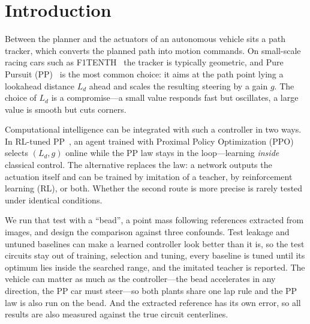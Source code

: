 \documentclass{IJCAS}
\begin{document}


\section{Introduction}
Between the planner and the actuators of an autonomous vehicle sits a path tracker, which converts the planned path into motion commands. On small-scale racing cars such as F1TENTH~\cite{okelly2020} the tracker is typically geometric, and Pure Pursuit (PP)~\cite{coulter1992,snider2009} is the most common choice: it aims at the path point lying a lookahead distance $L_d$ ahead and scales the resulting steering by a gain $g$. The choice of $L_d$ is a compromise---a small value responds fast but oscillates, a large value is smooth but cuts corners.

Computational intelligence can be integrated with such a controller in two ways. In RL-tuned PP~\cite{elgouhary2026}, an agent trained with Proximal Policy Optimization (PPO)~\cite{schulman2017} selects $(L_d,g)$ online while the PP law stays in the loop---learning \emph{inside} classical control. The alternative replaces the law: a network outputs the actuation itself and can be trained by imitation of a teacher, by reinforcement learning (RL), or both. Whether the second route is more precise is rarely tested under identical conditions.

We run that test with a ``bead'', a point mass following references extracted from images, and design the comparison against three confounds. Test leakage and untuned baselines can make a learned controller look better than it is, so the test circuits stay out of training, selection and tuning, every baseline is tuned until its optimum lies inside the searched range, and the imitated teacher is reported. The vehicle can matter as much as the controller---the bead accelerates in any direction, the PP car must steer---so both plants share one lap rule and the PP law is also run on the bead. And the extracted reference has its own error, so all results are also measured against the true circuit centerlines.
\end{document}
